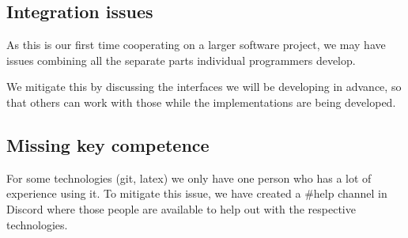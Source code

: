 \documentclass{article}
\begin{document}
\subsection*{Integration issues}

As this is our first time cooperating on a larger software project, we may have issues combining all the separate parts individual programmers develop.

We mitigate this by discussing the interfaces we will be developing in advance, so that others can work with those while the implementations are being developed.

\subsection*{Missing key competence}

For some technologies (git, latex) we only have one person who has a lot of experience using it. To mitigate this issue, we have created a \#help channel in Discord where those people are available to help out with the respective technologies.
\end{document}
